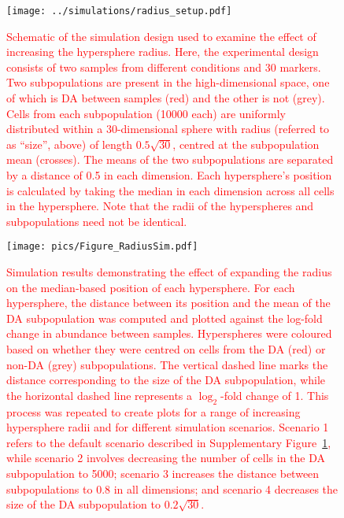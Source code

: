 \documentclass{article}
\newcommand\revised[1]{\textcolor{red}{#1}}
\begin{document}
\begin{figure}[tbp]
    \begin{center}
        \texttt{[image: ../simulations/radius\_setup.pdf]}
    \end{center}
    \caption{\revised{Schematic of the simulation design used to examine the effect of increasing the hypersphere radius.
        Here, the experimental design consists of two samples from different conditions and 30 markers.
        Two subpopulations are present in the high-dimensional space, one of which is DA between samples (red) and the other is not (grey).
        Cells from each subpopulation (10000 each) are uniformly distributed within a 30-dimensional sphere with radius (referred to as ``size'', above) of length $0.5\sqrt{30}$, centred at the subpopulation mean (crosses).
        The means of the two subpopulations are separated by a distance of 0.5 in each dimension.
        Each hypersphere's position is calculated by taking the median in each dimension across all cells in the hypersphere.
        Note that the radii of the hyperspheres and subpopulations need not be identical.
    }
    }
    \label{fig:radius_schematic}
\end{figure}

\begin{figure}[tbp]
    \begin{center}
        \texttt{[image: pics/Figure\_RadiusSim.pdf]}
    \end{center}
    \caption{\revised{Simulation results demonstrating the effect of expanding the radius on the median-based position of each hypersphere.
        For each hypersphere, the distance between its position and the mean of the DA subpopulation was computed and plotted against the log-fold change in abundance between samples.
        Hyperspheres were coloured based on whether they were centred on cells from the DA (red) or non-DA (grey) subpopulations.
        The vertical dashed line marks the distance corresponding to the size of the DA subpopulation, while the horizontal dashed line represents a $\log_2$-fold change of 1.
        This process was repeated to create plots for a range of increasing hypersphere radii and for different simulation scenarios.
        Scenario 1 refers to the default scenario described in Supplementary Figure~\ref{fig:radius_schematic}, while scenario 2 involves decreasing the number of cells in the DA subpopulation to 5000; scenario 3 increases the distance between subpopulations to 0.8 in all dimensions; and scenario 4 decreases the size of the DA subpopulation to $0.2\sqrt{30}$.
    }
    }
    \label{fig:radius_position}
\end{figure}
\end{document}
